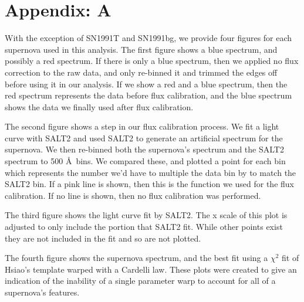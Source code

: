 \clearpage %
\section*{Appendix: A}
With the exception of SN1991T and SN1991bg, we provide four figures for each supernova used in this analysis. The first figure shows a blue spectrum, and possibly a red spectrum. If there is only a blue spectrum, then we applied no flux correction to the raw data, and only re-binned it and trimmed the edges off before using it in our analysis. If we show a red and a blue spectrum, then the red spectrum represents the data before flux calibration, and the blue spectrum shows the data we finally used after flux calibration.

The second figure shows a step in our flux calibration process. We fit a light curve with SALT2 and used SALT2 to generate an artificial spectrum for the supernova. We then re-binned both the supernova's spectrum and the SALT2 spectrum to 500 \AA\ bins. We compared these, and plotted a point for each bin which represents the number we'd have to multiple the data bin by to match the SALT2 bin. If a pink line is shown, then this is the function we used for the flux calibration. If no line is shown, then no flux calibration was performed.

The third figure shows the light curve fit by SALT2. The x scale of this plot is adjusted to only include the portion that SALT2 fit. While other points exist they are not included in the fit and so are not plotted.

The fourth figure shows the supernova spectrum, and the best fit using a $\chi^{2}$ fit of Hsiao's template warped with a Cardelli law. These plots were created to give an indication of the inability of a single parameter warp to account for all of a supernova's features.



